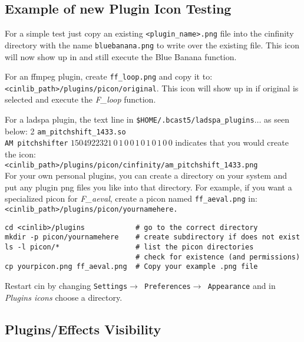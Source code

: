 \subsection{Example of new Plugin Icon Testing}%
\label{sub:example_plugin_icon_testing}

For a simple test just copy an existing \texttt{<plugin\_name>.png} file into the cinfinity directory with the name \texttt{bluebanana.png} to write over the existing file. This icon will now show up in \CGG{} and still execute the Blue Banana function.

For an ffmpeg plugin, create \texttt{ff\_loop.png} and copy it to: \\
\texttt{<cinlib\_path>/plugins/picon/original}. This icon will show up in \CGG{} if original is selected and execute the \textit{F\_loop} function.

For a ladspa plugin, the text line in \texttt{\$HOME/.bcast5/ladspa\_plugins}$\dots$ as seen below:
2 \texttt{am\_pitchshift\_1433.so} \\
\texttt{AM pitchshifter} $1504922321\, 0\, 1\, 0\, 0\, 1\, 0\, 1\, 0\, 1\, 0\, 0$ indicates that you would create the icon: \\ \texttt{<cinlib\_path>/plugins/picon/cinfinity/am\_pitchshift\_1433.png} \\
For your own personal plugins, you can create a directory on your system and put any plugin png files you like into that directory. For example, if you want a specialized picon for \textit{F\_aeval}, create a picon named \texttt{ff\_aeval.png} in: \\ \texttt{<cinlib\_path>/plugins/picon/yournamehere.}

\begin{lstlisting}[style=sh]
cd <cinlib>/plugins            # go to the correct directory
mkdir -p picon/yournamehere    # create subdirectory if does not exist
ls -l picon/*                  # list the picon directories
                               # check for existence (and permissions)
cp yourpicon.png ff_aeval.png  # Copy your example .png file
\end{lstlisting}

Restart cin by changing \texttt{Settings$\rightarrow$ Preferences$\rightarrow$ Appearance} and in \textit{Plugins icons} choose a directory.

\subsection{Plugins/Effects Visibility}%
\label{sub:plugins_effects_visibility}

